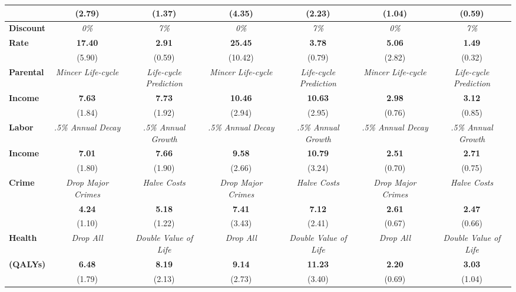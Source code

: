 \begin{tabular}{>{\bfseries}lcc|cc|cc}
	&	(2.79)	&	(1.37)	&	(4.35)	&	(2.23)	&	(1.04)	&	(0.59)	\\ \midrule
Discount 	&	\textit{0\%}	&	\textit{7\%}	&	\textit{0\%}	&	\textit{7\%}	&	\textit{0\%}	&	\textit{7\%}	\\
Rate	&	\textbf{17.40}	&	\textbf{2.91}	&	\textbf{25.45}	&	\textbf{3.78}	&	\textbf{5.06}	&	\textbf{1.49}	\\
	&	(5.90)	&	(0.59)	&	(10.42)	&	(0.79)	&	(2.82)	&	(0.32)	\\ \midrule
Parental	&	\textit{Mincer Life-cycle}	&	\textit{Life-cycle Prediction}	&	\textit{Mincer Life-cycle}	&	\textit{Life-cycle Prediction}	&	\textit{Mincer Life-cycle}	&	\textit{Life-cycle Prediction}	\\
Income	&	\textbf{7.63}	&	\textbf{7.73}	&	\textbf{10.46}	&	\textbf{10.63}	&	\textbf{2.98}	&	\textbf{3.12}	\\
	&	(1.84)	&	(1.92)	&	(2.94)	&	(2.95)	&	(0.76)	&	(0.85)	\\ \midrule
Labor	&	\textit{.5\% Annual Decay}	&	\textit{.5\% Annual Growth}	&	\textit{.5\% Annual Decay}	&	\textit{.5\% Annual Growth}	&	\textit{.5\% Annual Decay}	&	\textit{.5\% Annual Growth}	\\
Income	&	\textbf{7.01}	&	\textbf{7.66}	&	\textbf{9.58}	&	\textbf{10.79}	&	\textbf{2.51}	&	\textbf{2.71}	\\
	&	(1.80)	&	(1.90)	&	(2.66)	&	(3.24)	&	(0.70)	&	(0.75)	\\ \midrule
Crime	&	\textit{Drop Major Crimes}	&	\textit{Halve Costs}	&	\textit{Drop Major Crimes}	&	\textit{Halve Costs}	&	\textit{Drop Major Crimes}	&	\textit{Halve Costs}	\\
	&	\textbf{4.24}	&	\textbf{5.18}	&	\textbf{7.41}	&	\textbf{7.12}	&	\textbf{2.61}	&	\textbf{2.47}	\\
	&	(1.10)	&	(1.22)	&	(3.43)	&	(2.41)	&	(0.67)	&	(0.66)	\\ \midrule
Health	&	\textit{Drop All}	&	\textit{Double Value of Life}	&	\textit{Drop All}	&	\textit{Double Value of Life}	&	\textit{Drop All}	&	\textit{Double Value of Life}	\\
(QALYs)	&	\textbf{6.48}	&	\textbf{8.19}	&	\textbf{9.14}	&	\textbf{11.23}	&	\textbf{2.20}	&	\textbf{3.03}	\\
	&	(1.79)	&	(2.13)	&	(2.73)	&	(3.40)	&	(0.69)	&	(1.04)	\\ \bottomrule
\end{tabular} 